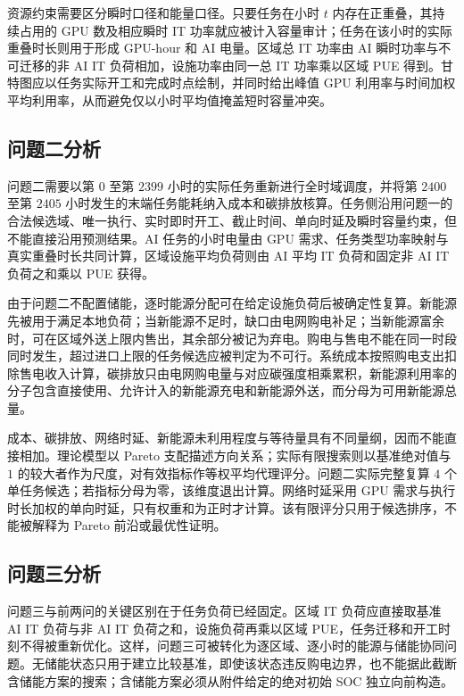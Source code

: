 资源约束需要区分瞬时口径和能量口径。只要任务在小时 $t$ 内存在正重叠，其持续占用的 GPU 数及相应瞬时 IT 功率就应被计入容量审计；任务在该小时的实际重叠时长则用于形成 GPU-hour 和 AI 电量。区域总 IT 功率由 AI 瞬时功率与不可迁移的非 AI IT 负荷相加，设施功率由同一总 IT 功率乘以区域 PUE 得到。甘特图应以任务实际开工和完成时点绘制，并同时给出峰值 GPU 利用率与时间加权平均利用率，从而避免仅以小时平均值掩盖短时容量冲突。

\subsection{问题二分析}

问题二需要以第 $0$ 至第 $2399$ 小时的实际任务重新进行全时域调度，并将第 $2400$ 至第 $2405$ 小时发生的末端任务能耗纳入成本和碳排放核算。任务侧沿用问题一的合法候选域、唯一执行、实时即时开工、截止时间、单向时延及瞬时容量约束，但不能直接沿用预测结果。AI 任务的小时电量由 GPU 需求、任务类型功率映射与真实重叠时长共同计算，区域设施平均负荷则由 AI 平均 IT 负荷和固定非 AI IT 负荷之和乘以 PUE 获得。

由于问题二不配置储能，逐时能源分配可在给定设施负荷后被确定性复算。新能源先被用于满足本地负荷；当新能源不足时，缺口由电网购电补足；当新能源富余时，可在区域外送上限内售出，其余部分被记为弃电。购电与售电不能在同一时段同时发生，超过进口上限的任务候选应被判定为不可行。系统成本按照购电支出扣除售电收入计算，碳排放只由电网购电量与对应碳强度相乘累积，新能源利用率的分子包含直接使用、允许计入的新能源充电和新能源外送，而分母为可用新能源总量。

成本、碳排放、网络时延、新能源未利用程度与等待量具有不同量纲，因而不能直接相加。理论模型以 Pareto 支配描述方向关系；实际有限搜索则以基准绝对值与 $1$ 的较大者作为尺度，对有效指标作等权平均代理评分。问题二实际完整复算 $4$ 个单任务候选；若指标分母为零，该维度退出计算。网络时延采用 GPU 需求与执行时长加权的单向时延，只有权重和为正时才计算。该有限评分只用于候选排序，不能被解释为 Pareto 前沿或最优性证明。

\subsection{问题三分析}

问题三与前两问的关键区别在于任务负荷已经固定。区域 IT 负荷应直接取基准 AI IT 负荷与非 AI IT 负荷之和，设施负荷再乘以区域 PUE，任务迁移和开工时刻不得被重新优化。这样，问题三可被转化为逐区域、逐小时的能源与储能协同问题。无储能状态只用于建立比较基准，即使该状态违反购电边界，也不能据此截断含储能方案的搜索；含储能方案必须从附件给定的绝对初始 SOC 独立向前构造。

